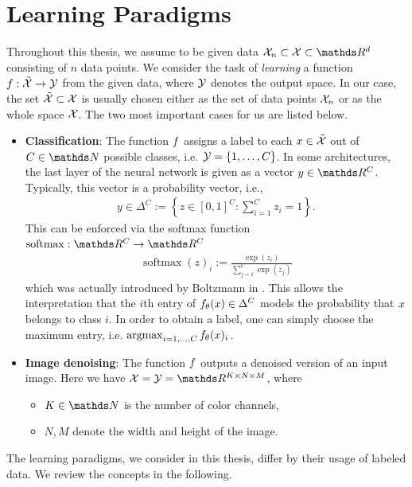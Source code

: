 \chapter{Learning Paradigms}\label{ch:para}

Throughout this thesis, we assume to be given data $\Inp_n\subset\Inp\subset \R^d$ consisting of $n$ data points. We consider the task of \emph{learning} a function $f:\tilde{\mathcal{X}}\to \mathcal{\mathcal{Y}}$ from the given data, where $\mathcal{\mathcal{Y}}$ denotes the output space. In our case, the set $\tilde{\mathcal{X}}\subset\mathcal{X}$ is usually chosen either as the set of data points $\mathcal{X}_n$ or as the whole space $\mathcal{X}$. The two most important cases for us are listed below.
%
\begin{itemize}
\item \textbf{Classification}: The function $f$ assigns a label to each $x\in \tilde{\mathcal{X}}$ out of $C\in\N$ possible classes, i.e. $\mathcal{\mathcal{Y}}=\{1,\ldots,C\}$. In some architectures, the last layer of the neural network is given as a vector $\oup\in\R^C$. Typically, this vector is a probability vector, i.e., 
%
\begin{align*}
y\in \Delta^C := \left\{z\in[0,1]^C: \sum_{i=1}^C z_i = 1\right\}.
\end{align*}
%
This can be enforced via the softmax function \cite{bridle1990probabilistic} $\operatorname{soft max}:\R^C\to\R^C$
%
\begin{align*}
\operatorname{soft max}(z)_i := \frac{\exp(z_i)}{\sum_{j=1}^C \exp(z_j)} 	
\end{align*}
%
which was actually introduced by Boltzmann in \cite{boltzmann1868studien}. This allows the interpretation that the $i$th entry of $f_\theta(x)\in\Delta^C$ models the probability that $x$ belongs to class $i$. In order to obtain a label, one can simply choose the maximum entry, i.e.  $\operatorname{argmax}_{i=1,\ldots,C} f_\theta(x)_i$.
%
\item \textbf{Image denoising}: The function $f$ outputs a denoised version of an input image. Here we have $\Inp = \Oup=\R^{K\times N\times M}$, where
%
\begin{itemize}
\item $K\in\N$ is the number of color channels,
\item $N,M$ denote the width and height of the image.
\end{itemize}
\end{itemize}
%
The learning paradigms, we consider in this thesis, differ by their usage of labeled data. We review the concepts in the following.
%
\clearpage%
